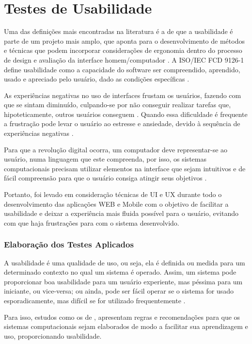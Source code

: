 \chapter{Testes de Usabilidade}

Uma das definições mais encontradas na literatura é a de que a usabilidade é parte de um projeto mais amplo, que aponta para o desenvolvimento de métodos e técnicas que podem incorporar considerações de ergonomia dentro do processo de design e avaliação da interface homem/computador \cite{bastien1993ergonomic}. A ISO/IEC FCD 9126-1 define usabilidade como a capacidade do software ser compreendido, aprendido, usado e apreciado pelo usuário, dado as condições específicas \cite{gonccalves2009usabilidade}.

As experiências negativas no uso de interfaces frustam os usuários, fazendo com que se sintam diminuído, culpando-se por não conseguir realizar tarefas que, hipoteticamente, outros usuários conseguem \cite{gonccalves2009usabilidade}. Quando essa dificuldade é frequente a frustração pode levar o usuário ao estresse e ansiedade, devido à sequência de experiências negativas \cite{cybis2003engenharia}.

Para que a revolução digital ocorra, um computador deve representar-se ao usuário, numa linguagem que este compreenda, por isso, os sistemas computacionais precisam utilizar elementos na interface que sejam intuitivos e de fácil compreensão para que o usuário consiga atingir seus objetivos \cite{johnson2001cultura}.

Portanto, foi levado em consideração técnicas de UI e UX durante todo o desenvolvimento das aplicações WEB e Mobile com o objetivo de facilitar a usabilidade e deixar a experiência mais fluida possível para o usuário, evitando com que haja frustrações para com o sistema desenvolvido.

\subsection{Elaboração dos Testes Aplicados}

A usabilidade é uma qualidade de uso, ou seja, ela é definida ou medida para um determinado contexto no qual um sistema é operado. Assim, um sistema pode proporcionar boa usabilidade para um usuário experiente, mas péssima para um iniciante, ou vice-versa; ou ainda, pode ser fácil operar se o sistema for usado esporadicamente, mas difícil se for utilizado frequentemente \cite{cybis2003engenharia}.

Para isso, estudos como os de \cite{bastien1993ergonomic}, apresentam regras e recomendações para que os sistemas computacionais sejam elaborados de modo a facilitar sua aprendizagem e uso, proporcionando usabilidade.


